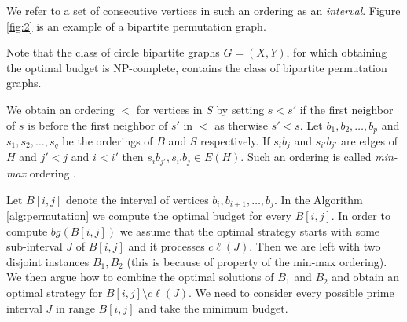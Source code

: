 \documentclass[letterpaper,11pt,abstracton]{scrartcl}
\begin{document}
We refer to a set of consecutive vertices in such an ordering as an \textit{interval}. Figure
\ref{fig:2} is an example of a bipartite permutation
graph.

Note that the class of circle bipartite graphs $G=(X,Y)$, for which
obtaining the optimal budget is NP-complete, contains the class of
bipartite permutation graphs.

We obtain an ordering $<$ for vertices in $S$ by setting $s < s'$ if the first neighbor of
$s$ is before the first neighbor of $s'$ in $<$ as therwise $s' < s$. Let $b_1,b_2,\dots,b_p$ and $s_1,s_2,\dots,s_q$ be the orderings of $B$ and $S$
respectively. If $s_ib_j$ and $s_{i'}b_{j'}$ are edges of $H$ and $j' <j$ and $i < i'$ then $s_ib_{j'},s_{i'}b_j \in E(H)$. 
Such an ordering is called {\em min-max} ordering \cite{GHRY08}.

 Let $B[i,j]$ denote the interval of vertices 
$b_i,b_{i+1},\dots,b_j$. In the Algorithm \ref{alg:permutation} we compute the optimal budget for every $B[i,j]$. In order to compute $bg(B[i,j])$ we assume that the optimal 
strategy starts with some sub-interval $J$ of 
$B[i,j]$ and it processes $c\ell(J)$. Then we are left with two disjoint instances $B_1,B_2$ (this is because of property of the min-max ordering). We then argue
how to combine the optimal solutions of $B_1$ and $B_2$ and obtain an optimal strategy for $B[i,j] \setminus c\ell(J)$. We need to consider every
possible prime interval $J$ in range $B[i,j]$ and take the minimum budget.  
\end{document}

